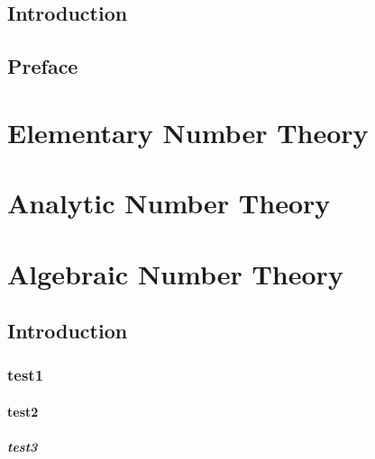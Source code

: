 


\author{Julien Racette}
\frontmatter
\chapter*{Introduction}
\chapter*{Preface}
\clearpage
\tableofcontents 
\pagestyle{fancy}


\mainmatter
\part{Elementary Number Theory}



\part{Analytic Number Theory}



\startcontents
\part{Algebraic Number Theory}

\chapter{Introduction}
\section{test1}
\subsection{test2}
\lipsum
\subsubsection{test3}
\lipsum






\nocite{Granville2025,Koukoulopoulos2020,Koukoulopoulos2024,Mestrovic2023,mertens_1874,mertens_1874,hadamard_1896,dlvp_1896}


\startcontents

\listoftodos
\backmatter

\printindex[general]

\printindex[notation]

\printbibliography


